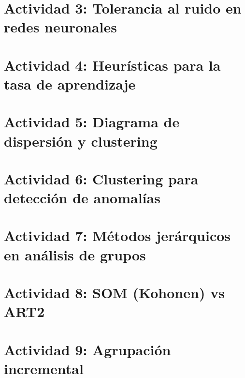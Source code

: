 \documentclass[11pt,a4paper]{article}
\theoremstyle{definition}
\theoremstyle{plain}
\theoremstyle{remark}
\begin{document}
\section{Actividad 3: Tolerancia al ruido en redes neuronales}


\section{Actividad 4: Heurísticas para la tasa de aprendizaje}


\section{Actividad 5: Diagrama de dispersión y clustering}


\section{Actividad 6: Clustering para detección de anomalías}


\section{Actividad 7: Métodos jerárquicos en análisis de grupos}


\section{Actividad 8: SOM (Kohonen) vs ART2}


\section{Actividad 9: Agrupación incremental}

\end{document}
